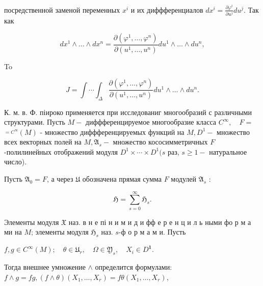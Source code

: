 \documentclass[10pt]{article}
\begin{document}
посредственной заменой переменных $x^{i}$ и их диффференциалов $d x^{i}=\frac{\partial \varphi^{i}}{\partial u^{j}} d u^{j}$. Так как



\[

d x^{1} \wedge \ldots \wedge d x^{n}=\frac{\partial\left(\varphi^{1}, \ldots, \varphi^{n}\right)}{\partial\left(u^{1}, \ldots, u^{n}\right)} d u^{1} \wedge \ldots \wedge d u^{n},

\]



To



\[

J=\int \cdots \int_{\Delta} \frac{\partial\left(\varphi^{1}, \ldots, \varphi^{n}\right)}{\partial\left(u^{1}, \ldots, u^{n}\right)} d u^{1} \wedge \ldots \wedge d u^{n} .

\]



К. м. в. Ф. піироко применяется при исследованиг многообразий с различными структурами. Пусть $M-$ диффференцируемое многообразие класса $C^{\infty}, \quad F=$ $\stackrel{=C^{\infty}}{ }(M)$ - множество диффференцируемых функций на $M, D^{1}-$ множество всех векторных полей на $M, \mathfrak{A}_{s}-$ множество кососимметричных $F$-полилинейных отображений модуля $D^{1} \times \cdots \times D^{1}(s$ раз, $s \geqslant 1-$ натуральное число).



Пусть $\mathfrak{A}_{0}=F$, а через $\mathfrak{U}$ обозначена прямая сумма $F$ модулей $\mathfrak{A}_{s}$ :



\[

\mathfrak{H}=\sum_{s=0}^{\infty} \mathfrak{H}_{s} .

\]



Элементы модуля $\mathfrak{X}$ наз. в н е пі н и м и д и фф е р е н ц и л ь ными фо р м а ми на $M$; элементы модуля $\mathfrak{H}_{s}$ наз. $s$-ф о р м а м и. Пусть



$f, g \in C^{\infty}(M) ; \quad \theta \in \mathfrak{U}_{r}, \quad \Omega \in \mathfrak{Y}_{s}, \quad X_{i} \in D^{\mathbf{1}}$.



Тогда внешнее умножение $\wedge$ определится формулами: $f \wedge g=f g,(f \wedge \theta)\left(X_{1}, \ldots, X_{r}\right)=f \theta\left(X_{1}, \ldots, X_{r}\right)$,
\end{document}
